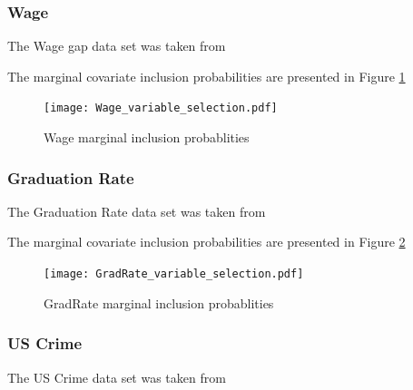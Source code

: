 \documentclass{amsart}[12pt]
\begin{document}
\subsubsection{Wage}
The Wage gap data set was taken from \cite{James:2014:ISL:2517747}

The marginal covariate inclusion probabilities are presented in Figure \ref{fig:Wage_inclusion}


\begin{figure}[p]
	\label{fig:Wage_inclusion}
	\caption{Wage marginal inclusion probablities}
	\texttt{[image: Wage\_variable\_selection.pdf]}
\end{figure}

\subsubsection{Graduation Rate}
The Graduation Rate data set was taken from \cite{James:2014:ISL:2517747}

The marginal covariate inclusion probabilities are presented in Figure \ref{fig:GradRate_inclusion}


\begin{figure}[p]
	\label{fig:GradRate_inclusion}
	\caption{GradRate marginal inclusion probablities}
	\texttt{[image: GradRate\_variable\_selection.pdf]}
\end{figure}

\subsubsection{US Crime}
The US Crime data set was taken from \cite{James:2014:ISL:2517747}
\end{document}
